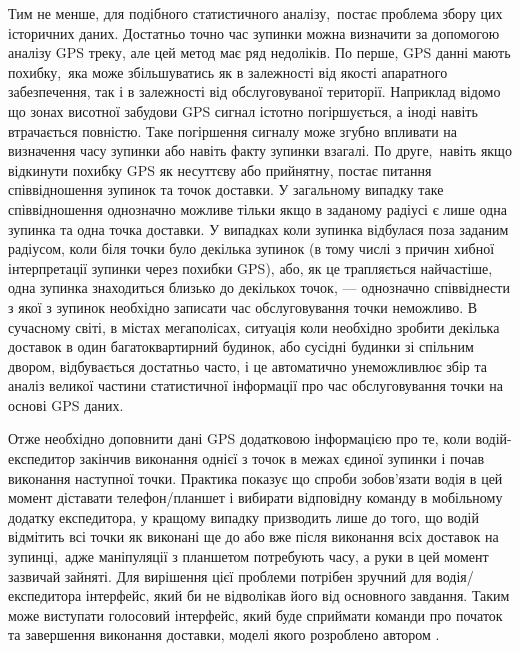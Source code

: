 Тим не менше, для подібного статистичного аналізу, постає проблема збору цих історичних даних. Достатньо точно час зупинки можна визначити за допомогою аналізу GPS треку, але цей метод має ряд недоліків. По перше, GPS данні мають похибку, яка може збільшуватись як в залежності від якості апаратного забезпечення, так і в залежності від обслуговуваної території. Наприклад відомо що зонах висотної забудови GPS сигнал істотно погіршується, а іноді навіть втрачається повністю. Таке погіршення сигналу може згубно впливати на визначення часу зупинки або навіть факту зупинки взагалі. По друге, навіть якщо відкинути похибку GPS як несуттєву або прийнятну, постає питання співвідношення зупинок та точок доставки. У загальному випадку таке співвідношення однозначно можливе тільки якщо в заданому радіусі є лише одна зупинка та одна точка доставки. У випадках коли зупинка відбулася поза заданим радіусом, коли біля точки було декілька зупинок (в тому числі з причин хибної інтерпретації зупинки через похибки GPS), або, як це трапляється найчастіше, одна зупинка знаходиться близько до декількох точок, --- однозначно співвіднести з якої з зупинок необхідно записати час обслуговування точки неможливо. В сучасному світі, в містах мегаполісах, ситуація коли необхідно зробити декілька доставок в один багатоквартирний будинок, або сусідні будинки зі спільним двором, відбувається достатньо часто, і це автоматично унеможливлює збір та аналіз великої частини статистичної інформації про час обслуговування точки на основі GPS даних.

Отже необхідно доповнити дані GPS додатковою інформацією про те, коли водій-експедитор закінчив виконання однієї з точок в межах єдиної зупинки і почав виконання наступної точки. Практика показує що спроби зобов'язати водія в цей момент діставати телефон/планшет і вибирати відповідну команду в мобільному додатку експедитора, у кращому випадку призводить лише до того, що водій відмітить всі точки як виконані ще до або вже після виконання всіх доставок на зупинці, адже маніпуляції з планшетом потребують часу, а руки в цей момент зазвичай зайняті. Для вирішення цієї проблеми потрібен зручний для водія/експедитора інтерфейс, який би не відволікав його від основного завдання. Таким може виступати голосовий інтерфейс, який буде сприймати команди про початок та завершення виконання доставки, моделі якого розроблено автором \cite{art2eng}.


